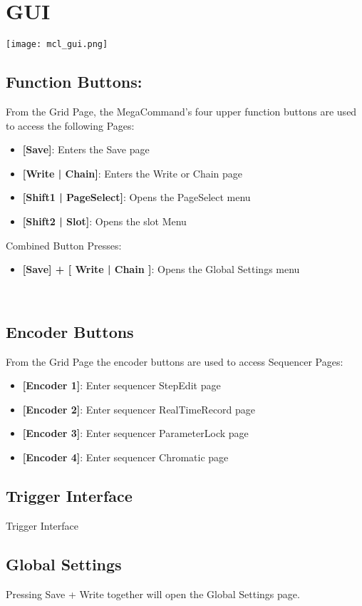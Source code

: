 \chapter{GUI}

\texttt{[image: mcl\_gui.png]}\\

\section{Function Buttons:}
From the Grid Page, the MegaCommand's four upper function buttons are used to access the following Pages:
\begin{itemize}
\item{\textbf{[Save]}: Enters the Save page}
\item{\textbf{[Write | Chain]}: Enters the Write or Chain page}
\item{\textbf{[Shift1 | PageSelect]}: Opens the PageSelect menu}
\item{\textbf{[Shift2 | Slot]}: Opens the slot Menu }
\end{itemize}
Combined Button Presses:
\begin{itemize}
\item{\textbf{[Save] + [ Write | Chain ]}: Opens the Global Settings menu }
\end{itemize}
\\
\section{Encoder Buttons}
From the Grid Page the encoder buttons are used to access Sequencer Pages:
\begin{itemize}
\item{\textbf{[Encoder 1]}: Enter sequencer StepEdit page}
\item{\textbf{[Encoder 2]}: Enter sequencer RealTimeRecord page}
\item{\textbf{[Encoder 3]}: Enter sequencer ParameterLock page}
\item{\textbf{[Encoder 4]}: Enter sequencer Chromatic page}

\end{itemize}
\section{Trigger Interface}
Trigger Interface

\section{Global Settings}
Pressing Save + Write together will open the Global Settings page.

